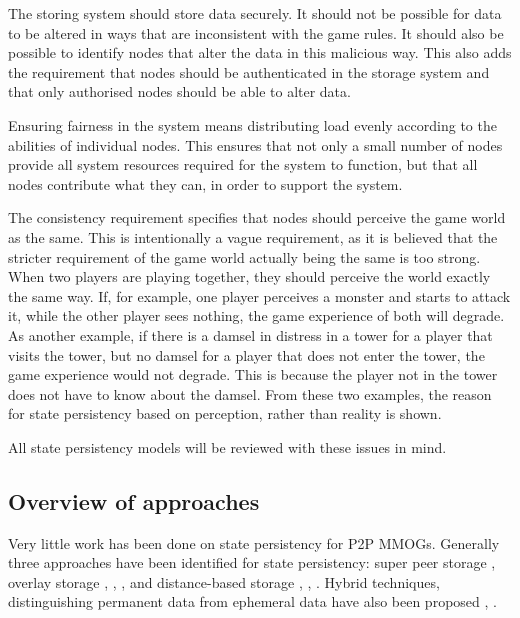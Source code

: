 \documentclass[journal,oneside,a4paper,onecolumn]{IEEEtran}
\begin{document}
The storing system should store data securely. It should not be possible for data to be altered in ways that are inconsistent with the game rules. It should also be possible to identify nodes that alter the data in this malicious way. This also adds the requirement that nodes should be authenticated in the storage system and that only authorised nodes should be able to alter data.

Ensuring fairness in the system means distributing load evenly according to the abilities of individual nodes. This ensures that not only a small number of nodes provide all system resources required for the system to function, but that all nodes contribute what they can, in order to support the system.

The consistency requirement specifies that nodes should perceive the game world as the same. This is intentionally a vague requirement, as it is believed that the stricter requirement of the game world actually being the same is too strong. When two players are playing together, they should perceive the world exactly the same way. If, for example, one player perceives a monster and starts to attack it, while the other player sees nothing, the game experience of both will degrade. As another example, if there is a damsel in distress in a tower for a player that visits the tower, but no damsel for a player that does not enter the tower, the game experience would not degrade. This is because the player not in the tower does not have to know about the damsel. From these two examples, the reason for state persistency based on perception, rather than reality is shown.

All state persistency models will be reviewed with these issues in mind.

\subsection{Overview of approaches}
\label{p2p_mmog_cm_overview}

Very little work has been done on state persistency for P2P MMOGs. Generally three approaches have been identified for state persistency: super peer storage \cite{knutsson_p2p_first}, overlay storage \cite{Douglas05enablingmassively}, \cite{using_freenet_storage}, \cite{Fan_phd}, \cite{past_storage_focus} and distance-based storage \cite{Buyukkaya_voronoi_state_management}, \cite{Hu_voronoi_IM}, \cite{colyseus_distance_based}. Hybrid techniques, distinguishing permanent data from ephemeral data have also been proposed \cite{zoned_federation}, \cite{hybrid_storage1}.
\end{document}
